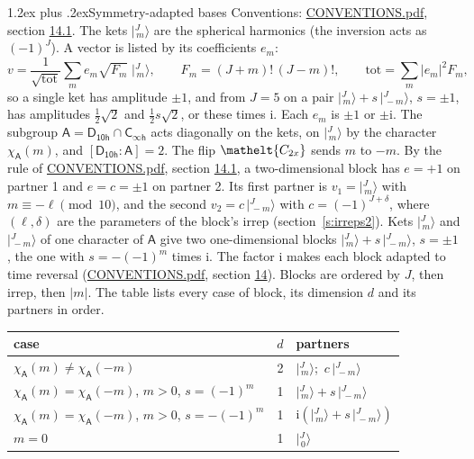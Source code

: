 \documentclass[10pt,a4paper]{article}
\makeatletter
\renewcommand\section{\@startsection{section}{1}{\z@}{-3ex plus -1ex minus -.2ex}%
  {1.2ex plus .2ex}{\normalfont\large\sffamily\bfseries\color{parttitle}}}
\numberwithin{equation}{section}
\newcommand{\eltfont}[1]{{\let\sigma\eltsigma\mathelt{#1}}}
\newcommand{\grp}[1]{\mathsf{#1}}
\newcommand{\elt}[1]{\eltfont{#1}}
\newcommand{\grpindex}[2]{[#1 : #2]}
\newcommand{\iunit}{\mathrm{i}}
\newcommand{\chiA}{\chi_{\grp{A}}}
\newcommand{\jm}[2]{\bigl\lvert{}^{#1}_{\,#2}\bigr\rangle}
\makeatother
\begin{document}
\section{Symmetry-adapted bases}\label{s:bases}
Conventions: \href{../../CONVENTIONS.pdf}{CONVENTIONS.pdf}, section \href{../../CONVENTIONS.pdf\#conv.14.1}{14.1}.
\leavevmode\label{n:index.m}\label{n:vector.ket}The kets $\jm{J}{m}$ are the spherical harmonics (the inversion acts as $(-1)^J$). \label{n:index.ketcoefficient}\label{n:vector.basis.symmetry}\label{n:index.ketweight}\label{n:index.total}A vector is listed by its coefficients $e_m$:
\begin{equation}\label{e:ket}v = \frac{1}{\sqrt{\mathrm{tot}}}\sum_m e_m\sqrt{F_m}\;\jm{J}{m},\qquad F_m = (J+m)!\,(J-m)!,\qquad \mathrm{tot} = \sum_m |e_m|^2F_m,\end{equation}
\leavevmode\label{n:index.pair.sign}so a single ket has amplitude $\pm1$, and from $J = 5$ on a pair $\jm{J}{m} + s\,\jm{J}{-m}$, $s = \pm1$, has amplitudes $\tfrac{1}{2}\sqrt{2}$ and $\tfrac{1}{2}s\sqrt{2}$, or these times $\iunit$. Each $e_m$ is $\pm1$ or $\pm\iunit$.
\leavevmode\label{n:group.A}\label{n:function.character.abelian}The subgroup $\grp{A} = \grp{D_{10h}}\cap\grp{C_{\infty h}}$ acts diagonally on the kets, on $\jm{J}{m}$ by the character $\chiA(m)$, and $\grpindex{\grp{D_{10h}}}{\grp{A}} = 2$. The flip $\elt{C_{2x}}$ sends $m$ to $-m$. \label{n:index.partner.sign}By the rule of \href{../../CONVENTIONS.pdf}{CONVENTIONS.pdf}, section \href{../../CONVENTIONS.pdf\#conv.14.1}{14.1}, a two-dimensional block has $e = +1$ on partner 1 and $e = c = \pm1$ on partner 2. Its first partner is $v_1 = \jm{J}{m}$ with $m \equiv -\ell \pmod{10}$, and the second $v_2 = c\,\jm{J}{-m}$ with $c = (-1)^{J+\delta}$, where $(\ell, \delta)$ are the parameters of the block's irrep (section~\ref{s:irreps2}). Kets $\jm{J}{m}$ and $\jm{J}{-m}$ of one character of $\grp{A}$ give two one-dimensional blocks $\jm{J}{m} + s\,\jm{J}{-m}$, $s = \pm1$, the one with $s = -(-1)^m$ times $\iunit$. The factor $\iunit$ makes each block adapted to time reversal (\href{../../CONVENTIONS.pdf}{CONVENTIONS.pdf}, section \href{../../CONVENTIONS.pdf\#conv.14}{14}). Blocks are ordered by $J$, then irrep, then $|m|$.
\leavevmode\label{n:head.case}\label{n:head.partners}The table lists every case of block, its dimension $d$ and its partners in order.
\begin{center}\begin{tabular}{@{}lrl@{}}\toprule
case & $d$ & partners\\\midrule
$\chiA(m) \ne \chiA(-m)$ & 2 & $\jm{J}{m}$;\ $c\,\jm{J}{-m}$\\
$\chiA(m) = \chiA(-m)$, $m > 0$, $s = (-1)^m$ & 1 & $\jm{J}{m} + s\,\jm{J}{-m}$\\
$\chiA(m) = \chiA(-m)$, $m > 0$, $s = -(-1)^m$ & 1 & $\iunit(\jm{J}{m} + s\,\jm{J}{-m})$\\
$m = 0$ & 1 & $\jm{J}{0}$\\
\bottomrule\end{tabular}\end{center}
\end{document}
